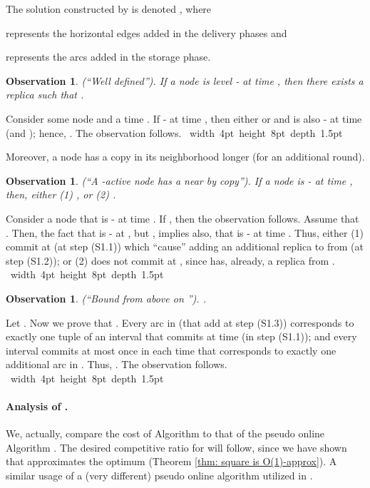 \documentclass[11pt]{article}
\newtheorem{observation}[theorem]{Observation}
\def\proof{\par\noindent{\bf Proof:~}}
\def\blackslug{\hbox{\hskip 1pt \vrule width 4pt height 8pt
    depth 1.5pt \hskip 1pt}}
\def\QED{\quad\blackslug\lower 8.5pt\null\par}
\begin{document}
The solution constructed by  is denoted , where

represents the horizontal edges added in the delivery phases and

represents the arcs added in the storage phase.


\begin{observation}
{\sc (``Well defined'').}
If a node  is level - at time ,
then there exists a replica  such that . \label{obser:Dlinoon: well defined}
\end{observation}
\def\AppDlineonObserWellDefined{
\proof
Consider some node  and a time . If - at time ,
then either
 or  and
 is also - at time  (and
);
hence, .
The observation follows.
\QED
} \AppDlineonObserWellDefined

Moreover, a  node  has a copy in its neighborhood longer (for an additional round).



\begin{observation}
{\sc (``A -active node has a near by copy'').}
If a node  is - at time , then, either
(1) ,
or
(2) .
\label{obser:Dlineon: a l active has a near by copy}
\end{observation}
\def\AppObserDlineonActiveNearByCopy{
\proof
Consider a node  that is -  at time .
If , then the observation follows.
Assume that .
Then, the fact that  is - at ,
but , implies also, that  is - at time .
Thus,  either (1)  commit at  (at step (S1.1)) which ``cause'' adding an additional replica to  from  (at step (S1.2));
or (2)  does not commit at , since  has, already, a replica from .
\QED
} \AppObserDlineonActiveNearByCopy



\begin{observation}
{\sc (``Bound from above on '').}
.
\label{obser:Dlineon: |Commit|=|Aon-0|}
\end{observation}
\def\AppObserDlineonBoundFromAboveonCommit{
\proof
Let
.
Now we prove that .
Every arc in  (that add at step (S1.3)) corresponds to exactly one tuple  of an interval  that commits at time  (in step (S1.1));
and every interval commits at most once in each time  that corresponds to exactly one additional arc in .
Thus, .
The observation follows.
\QED
} \AppObserDlineonBoundFromAboveonCommit


\vspace{-0.5cm}
\paragraph*{\bf Analysis of \commsingle.\commsingleend}
We, actually, compare the cost of Algorithm  to that of the pseudo online Algorithm .
The desired competitive ratio for  will follow, since we have shown that  approximates the optimum (Theorem \ref{thm: square is O(1)-approx}).
A similar usage of a (very different) pseudo online algorithm utilized in \cite{KK2014}.
\commlong
\end{document}
